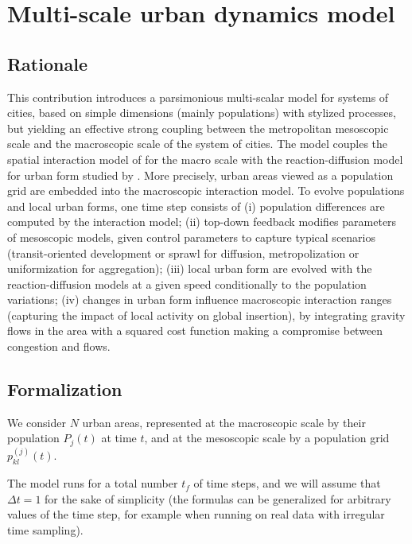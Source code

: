 \documentclass[11pt]{article}
\begin{document}
\section{Multi-scale urban dynamics model}

\subsection{Rationale}


This contribution introduces a parsimonious multi-scalar model for systems of cities, based on simple dimensions (mainly populations) with stylized processes, but yielding an effective strong coupling between the metropolitan mesoscopic scale and the macroscopic scale of the system of cities.
The model couples the spatial interaction model of \cite{raimbault2018indirect} for the macro scale with the reaction-diffusion model for urban form studied by \cite{raimbault2018calibration}. More precisely, urban areas viewed as a population grid are embedded into the macroscopic interaction model. To evolve populations and local urban forms, one time step consists of (i) population differences are computed by the interaction model; (ii) top-down feedback modifies parameters of mesoscopic models, given control parameters to capture typical scenarios (transit-oriented development or sprawl for diffusion, metropolization or uniformization for aggregation); (iii) local urban form are evolved with the reaction-diffusion models at a given speed conditionally to the population variations; (iv) changes in urban form influence macroscopic interaction ranges (capturing the impact of local activity on global insertion), by integrating gravity flows in the area with a squared cost function making a compromise between congestion and flows.



\subsection{Formalization}


We consider $N$ urban areas, represented at the macroscopic scale by their population $P_j(t)$ at time $t$, and at the mesoscopic scale by a population grid $p_{kl}^{(j)}(t)$.

The model runs for a total number $t_f$ of time steps, and we will assume that $\Delta t = 1$ for the sake of simplicity (the formulas can be generalized for arbitrary values of the time step, for example when running on real data with irregular time sampling).
\end{document}
